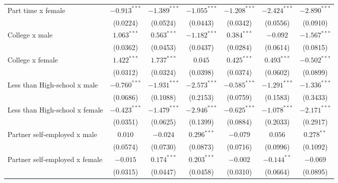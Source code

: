 \begin{tabular}{l|ccc|ccc}
Part time x female                     &  $-0.913^{***}$ &  $-1.389^{***}$ &  $-1.055^{***}$ &         $-1.208^{***}$ &  $-2.424^{***}$ &  $-2.890^{***}$ \\
                                       &        (0.0224) &        (0.0524) &        (0.0443) &               (0.0342) &        (0.0556) &        (0.0910) \\
College x male                         &   $1.063^{***}$ &   $0.563^{***}$ &  $-1.182^{***}$ &          $0.384^{***}$ &        $-0.092$ &  $-1.567^{***}$ \\
                                       &        (0.0362) &        (0.0453) &        (0.0437) &               (0.0284) &        (0.0614) &        (0.0815) \\
College x female                       &   $1.422^{***}$ &   $1.737^{***}$ &         $0.045$ &          $0.425^{***}$ &   $0.493^{***}$ &  $-0.502^{***}$ \\
                                       &        (0.0312) &        (0.0324) &        (0.0398) &               (0.0374) &        (0.0602) &        (0.0899) \\
Less than High-school x male           &  $-0.760^{***}$ &  $-1.931^{***}$ &  $-2.573^{***}$ &         $-0.585^{***}$ &  $-1.291^{***}$ &  $-1.336^{***}$ \\
                                       &        (0.0686) &        (0.1088) &        (0.2153) &               (0.0759) &        (0.1583) &        (0.3433) \\
Less than High-school x female         &  $-0.423^{***}$ &  $-1.479^{***}$ &  $-2.946^{***}$ &         $-0.625^{***}$ &  $-1.078^{***}$ &  $-2.171^{***}$ \\
                                       &        (0.0351) &        (0.0625) &        (0.1399) &               (0.0884) &        (0.2033) &        (0.2917) \\
Partner self-employed x male           &         $0.010$ &        $-0.024$ &   $0.296^{***}$ &               $-0.079$ &         $0.056$ &    $0.278^{**}$ \\
                                       &        (0.0574) &        (0.0730) &        (0.0873) &               (0.0716) &        (0.0996) &        (0.1092) \\
Partner self-employed x female         &        $-0.015$ &   $0.174^{***}$ &   $0.203^{***}$ &               $-0.002$ &   $-0.144^{**}$ &        $-0.069$ \\
                                       &        (0.0315) &        (0.0447) &        (0.0458) &               (0.0310) &        (0.0664) &        (0.0895) \\

\end{tabular}
